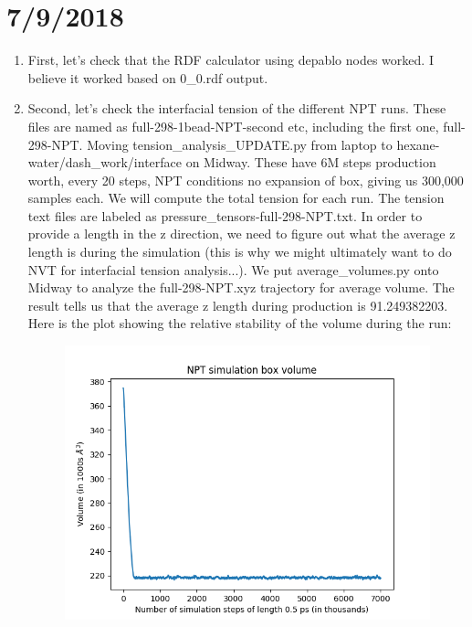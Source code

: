\documentclass[12pt,reqno]{amsart}
\numberwithin{equation}{section}
\begin{document}
\section{7/9/2018}
\begin{enumerate}
\item First, let's check that the RDF calculator using depablo nodes worked.  I believe it worked based on 0\_0.rdf output.  
\item Second, let's check the interfacial tension of the different NPT runs.  These files are named as full-298-1bead-NPT-second etc, including the first one, full-298-NPT.  Moving tension\_analysis\_UPDATE.py from laptop to hexane-water/dash\_work/interface on Midway.  These have 6M steps production worth, every 20 steps, NPT conditions no expansion of box, giving us 300,000 samples each.  We will compute the total tension for each run.  The tension text files are labeled as pressure\_tensors-full-298-NPT.txt.  In order to provide a length in the z direction, we need to figure out what the average z length is during the simulation (this is why we might ultimately want to do NVT for interfacial tension analysis...).  We put average\_volumes.py onto Midway to analyze the full-298-NPT.xyz trajectory for average volume.  The result tells us that the average z length during production is 91.249382203.  Here is the plot showing the relative stability of the volume during the run:

\begin{figure}[H]
\centering
\includegraphics[scale=0.6]{full-298-NPT-volumes}
\end{figure}


\end{enumerate}
\end{document}
